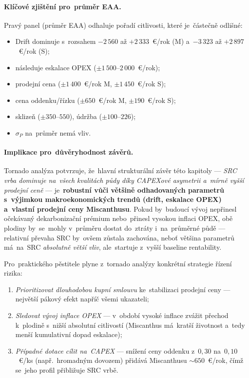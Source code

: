 \paragraph{Klíčové zjištění pro~průměr EAA.}
Pravý panel (průměr EAA) odhaluje pořadí citlivosti, které je~částečně
odlišné:
\begin{itemize}
    \item Drift dominuje s~rozsahem $-2\,560$ až $+2\,333$~€/rok (M)
          a~$-3\,323$ až $+2\,897$~€/rok (S);
    \item následuje eskalace OPEX ($\pm 1\,500$--$2\,000$~€/rok);
    \item prodejní cena ($\pm 1\,400$~€/rok M, $\pm 1\,450$~€/rok S);
    \item cena oddenku/řízku ($\pm 650$~€/rok M, $\pm 190$~€/rok S);
    \item sklizeň ($\pm 350$--$550$), údržba ($\pm 100$--$226$);
    \item $\sigma_P$ na~průměr nemá vliv.
\end{itemize}

\paragraph{Implikace pro~důvěryhodnost závěrů.}
Tornado analýza potvrzuje, že~hlavní strukturální závěr této kapitoly
--- \emph{SRC vrba dominuje na~všech kvalitách půdy díky CAPEXové
asymetrii a~mírně vyšší prodejní ceně} --- je~\textbf{robustní vůči
většině odhadovaných parametrů s~výjimkou makroekonomických trendů
(drift, eskalace OPEX) a~vlastní prodejní ceny Miscanthusu}. Pokud
by~budoucí vývoj nepřinesl očekávaný dekarbonizační prémium
nebo~přinesl vysokou inflaci OPEX, obě plodiny by~se~mohly v~průměru
dostat do~ztráty i~na~průměrné půdě --- relativní převaha SRC by~ovšem
zůstala zachována, neboť většina parametrů má~na~SRC \emph{absolutně
větší vliv}, ale~startuje z~vyšší baseline rentability.

Pro~praktického pěstitele plyne z~tornado analýzy konkrétní strategie
řízení rizika:
\begin{enumerate}
    \item \emph{Prioritizovat dlouhodobou kupní smlouvu} ke~stabilizaci
          prodejní ceny --- největší pákový efekt napříč všemi ukazateli;
    \item \emph{Sledovat vývoj inflace OPEX} --- v~období vysoké inflace
          zvážit přechod k~plodině s~nižší absolutní citlivostí
          (Miscanthus má~kratší životnost a~tedy menší kumulativní
          dopad eskalace);
    \item \emph{Případné dotace cílit na~CAPEX} --- snížení ceny oddenku
          z~$0{,}30$ na~$0{,}10$~€/ks (např.~hromadným dovozem) přidává
          Miscanthusu $\sim 650$~€/rok, čímž se~jeho profil přibližuje
          SRC vrbě.
\end{enumerate}


